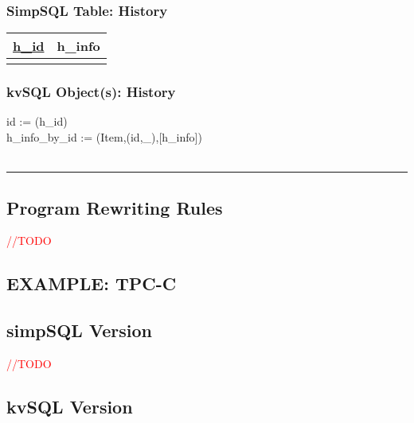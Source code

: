 \documentclass[12pt,letter]{article}
\begin{document}
\subsubsection*{SimpSQL Table: History}  
\begin{tabular}{ |c|c| }
 \hline
 \underline{h\_id} & h\_info\\
 \hline
 &   \\
 \hline
\end{tabular}

\subsubsection*{kvSQL Object(s): History}  
id := (h\_id)\\
 h\_info\_by\_id := 
(Item,(id,\_),[h\_info]) \\
\\
\hrule



\vspace{10mm}
\subsection{Program Rewriting Rules}
\textcolor{red}{//TODO}

\subsection{EXAMPLE: TPC-C}


\subsection{simpSQL Version}
\textcolor{red}{//TODO}
\subsection{kvSQL Version}
\end{document}
